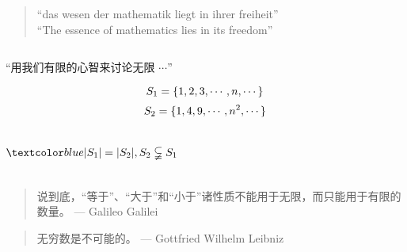 \begin{frame}{}

  \pause
  \begin{quote}
    \begin{center}
    ``das wesen der mathematik liegt in ihrer freiheit'' \\[8pt]
    \pause
    ``The essence of mathematics lies in its freedom''
    \end{center}
  \end{quote}
\end{frame}

\begin{frame}{}
  \begin{columns}
  \end{columns}
\end{frame}

\begin{frame}{}
  \centerline{``用我们有限的心智来讨论无限 $\cdots$''}

  \[
    S_1 = \{1, 2, 3, \cdots, n, \cdots\}
  \]
  \[
    S_2 = \{1, 4, 9, \cdots, n^2, \cdots\}
  \]

  \begin{columns}
      \pause
      \[
	\blue{|S_1| = |S_2|, S_2 \subsetneqq S_1}
      \]

      \pause
      \centerline{}
      \pause
  \end{columns}

  \pause
  \vspace{0.20cm}
  \begin{quote}
    说到底，``等于''、``大于''和``小于''诸性质不能用于无限，而只能用于有限的数量。 \hfill --- Galileo Galilei
  \end{quote}

  \pause
  \vspace{0.20cm}
  \begin{quote}
    无穷数是不可能的。 \hfill --- Gottfried Wilhelm Leibniz
  \end{quote}
\end{frame}

